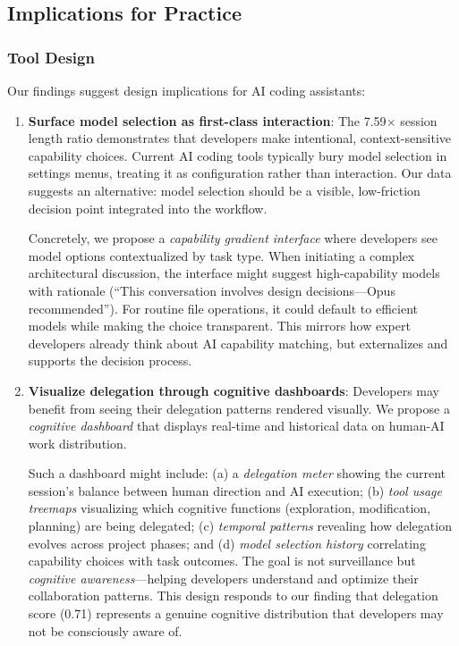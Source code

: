 \documentclass{ntlabs-preprint}
\begin{document}
\subsection{Implications for Practice}

\subsubsection{Tool Design}

Our findings suggest design implications for AI coding assistants:

\begin{enumerate}
    \item \textbf{Surface model selection as first-class interaction}: The 7.59$\times$ session length ratio demonstrates that developers make intentional, context-sensitive capability choices. Current AI coding tools typically bury model selection in settings menus, treating it as configuration rather than interaction. Our data suggests an alternative: model selection should be a visible, low-friction decision point integrated into the workflow.

    Concretely, we propose a \textit{capability gradient interface} where developers see model options contextualized by task type. When initiating a complex architectural discussion, the interface might suggest high-capability models with rationale (``This conversation involves design decisions---Opus recommended''). For routine file operations, it could default to efficient models while making the choice transparent. This mirrors how expert developers already think about AI capability matching, but externalizes and supports the decision process.

    \item \textbf{Visualize delegation through cognitive dashboards}: Developers may benefit from seeing their delegation patterns rendered visually. We propose a \textit{cognitive dashboard} that displays real-time and historical data on human-AI work distribution.

    Such a dashboard might include: (a) a \textit{delegation meter} showing the current session's balance between human direction and AI execution; (b) \textit{tool usage treemaps} visualizing which cognitive functions (exploration, modification, planning) are being delegated; (c) \textit{temporal patterns} revealing how delegation evolves across project phases; and (d) \textit{model selection history} correlating capability choices with task outcomes. The goal is not surveillance but \textit{cognitive awareness}---helping developers understand and optimize their collaboration patterns. This design responds to our finding that delegation score (0.71) represents a genuine cognitive distribution that developers may not be consciously aware of.


\end{enumerate}
\end{document}
